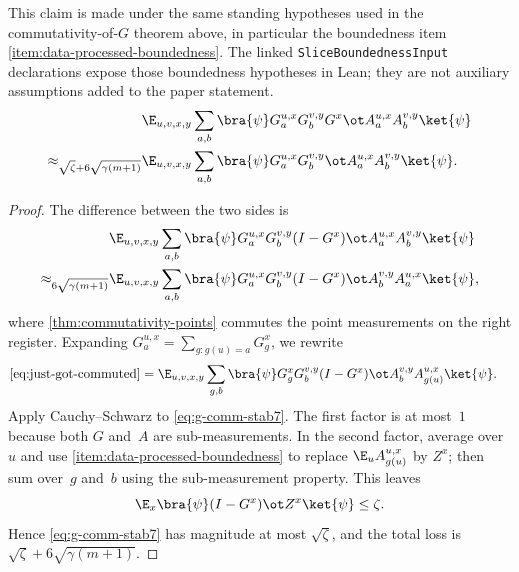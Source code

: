 \begin{lemma}\label{clm:g-comm-stability2}
	\leanok
	This claim is made under the same standing hypotheses used in the
	commutativity-of-$G$ theorem above, in particular the boundedness item
	\ref{item:data-processed-boundedness}.  The linked
	\texttt{SliceBoundednessInput} declarations expose those boundedness
	hypotheses in Lean; they are not auxiliary assumptions added to the paper
	statement.
	\begin{align*}
		                                           & \E_{u,v,x,y} \sum_{a,b}
		\bra{\psi} G_a^{u,x} G_b^{v,y} G^x \ot A_a^{u,x} A_b^{v,y} \ket{\psi} \\
		\approx_{\sqrt{\zeta}+6\sqrt{\gamma(m+1)}} &
		\E_{u,v,x,y} \sum_{a,b}
		\bra{\psi} G_a^{u,x} G_b^{v,y} \ot A_a^{u,x} A_b^{v,y} \ket{\psi}.
	\end{align*}
\end{lemma}
\begin{proof}
	\leanok
	The difference between the two sides is
	\begin{align}
		                              & \E_{u,v,x,y} \sum_{a,b}
		\bra{\psi} G_a^{u,x} G_b^{v,y} (I-G^x) \ot A_a^{u,x} A_b^{v,y} \ket{\psi}\nonumber \\
		\approx_{6\sqrt{\gamma(m+1)}} &
		\E_{u,v,x,y} \sum_{a,b}
		\bra{\psi} G_a^{u,x} G_b^{v,y} (I-G^x) \ot A_b^{v,y} A_a^{u,x} \ket{\psi},
		\label{eq:just-got-commuted}
	\end{align}
	where \ref{thm:commutativity-points} commutes the point measurements on the right register. Expanding $G_a^{u,x}=\sum_{g:g(u)=a} G_g^x$, we rewrite
	\begin{align}
		\eqref{eq:just-got-commuted}
		 & = \E_{u,v,x,y} \sum_{g,b}
		\bra{\psi} G_g^x G_b^{v,y} (I-G^x) \ot A_b^{v,y} A_{g(u)}^{u,x} \ket{\psi}.
		\label{eq:g-comm-stab7}
	\end{align}
	Apply Cauchy--Schwarz to \ref{eq:g-comm-stab7}. The first factor is at most~$1$ because both $G$ and~$A$ are sub-measurements. In the second factor, average over~$u$ and use \ref{item:data-processed-boundedness} to replace $\E_u A_{g(u)}^{u,x}$ by $Z^x$; then sum over~$g$ and~$b$ using the sub-measurement property. This leaves
	\[
		\E_x \bra{\psi} (I-G^x) \ot Z^x \ket{\psi} \le \zeta.
	\]
	Hence \ref{eq:g-comm-stab7} has magnitude at most $\sqrt{\zeta}$, and the total loss is $\sqrt{\zeta}+6\sqrt{\gamma(m+1)}$.
\end{proof}

